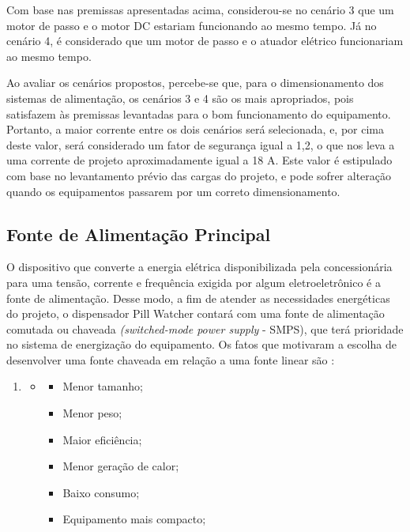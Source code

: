 Com base nas premissas apresentadas acima, considerou-se no cenário 3 que um motor de passo e o motor DC estariam funcionando ao mesmo tempo. Já no cenário 4, é considerado que um motor de passo e o atuador elétrico funcionariam ao mesmo tempo.

Ao avaliar os cenários propostos, percebe-se que, para o dimensionamento dos sistemas de alimentação, os cenários 3 e 4 são os mais apropriados, pois satisfazem às premissas levantadas para o bom funcionamento do equipamento. Portanto, a maior corrente entre os dois cenários será selecionada, e, por cima deste valor, será considerado um fator de segurança igual a 1,2, o que nos leva a uma corrente de projeto aproximadamente igual a 18 A. Este valor é estipulado com base no levantamento prévio das cargas do projeto, e pode sofrer alteração quando os equipamentos passarem por um correto dimensionamento.

\subsection{Fonte de Alimentação Principal}

 
 O dispositivo que converte a energia elétrica disponibilizada pela concessionária para uma tensão, corrente e frequência exigida por algum eletroeletrônico é a fonte de alimentação. Desse modo, a fim de atender as necessidades energéticas do projeto, o dispensador Pill Watcher contará com uma fonte de alimentação comutada ou chaveada \textit{(switched-mode power supply} - SMPS), que terá prioridade no sistema de energização do equipamento. Os fatos que motivaram a escolha de desenvolver uma fonte chaveada em relação a uma fonte linear são \cite{Projeto_fonte}:
 
 \begin{enumerate}
    \item[ ]
    \begin{itemize}
        \item[ ]
        \begin{itemize}
            \item Menor tamanho;
            \item Menor peso;
            \item Maior eficiência;
            \item Menor geração de calor;
            \item Baixo consumo;
            \item Equipamento mais compacto;
        \end{itemize}
    \end{itemize}
\end{enumerate}

